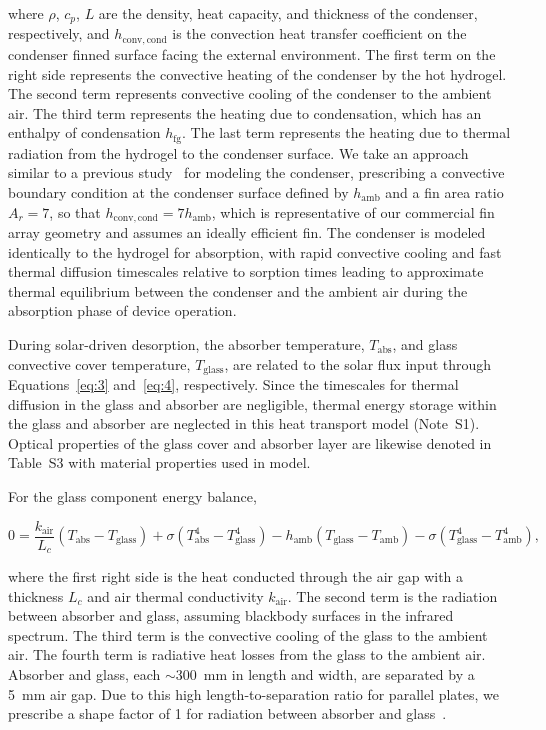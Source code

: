 \documentclass[11pt]{article}
\begin{document}
\noindent where $\rho$, $c_p$, $L$ are the density, heat capacity, and thickness of the condenser, respectively, and $h_{\mathrm{conv,cond}}$ is the convection heat transfer coefficient on the condenser finned surface facing the external environment. The first term on the right side represents the convective heating of the condenser by the hot hydrogel. The second term represents convective cooling of the condenser to the ambient air. The third term represents the heating due to condensation, which has an enthalpy of condensation $h_{\mathrm{fg}}$. The last term represents the heating due to thermal radiation from the hydrogel to the condenser surface. We take an approach similar to a previous study~\cite{lapotin2021} for modeling the condenser, prescribing a convective boundary condition at the condenser surface defined by $h_{\mathrm{amb}}$ and a fin area ratio $A_r = 7$, so that $h_{\mathrm{conv,cond}} = 7 h_{\mathrm{amb}}$, which is representative of our commercial fin array geometry and assumes an ideally efficient fin. The condenser is modeled identically to the hydrogel for absorption, with rapid convective cooling and fast thermal diffusion timescales relative to sorption times leading to approximate thermal equilibrium between the condenser and the ambient air during the absorption phase of device operation.

During solar-driven desorption, the absorber temperature, $T_{\mathrm{abs}}$, and glass convective cover temperature, $T_{\mathrm{glass}}$, are related to the solar flux input through Equations~\ref{eq:3} and~\ref{eq:4}, respectively. Since the timescales for thermal diffusion in the glass and absorber are negligible, thermal energy storage within the glass and absorber are neglected in this heat transport model (Note~S1). Optical properties of the glass cover and absorber layer are likewise denoted in Table~S3 with material properties used in model.

For the glass component energy balance,

\begin{equation}
0 = \frac{k_{\mathrm{air}}}{L_c}\left(T_{\mathrm{abs}} - T_{\mathrm{glass}}\right) + \sigma\left(T_{\mathrm{abs}}^4 - T_{\mathrm{glass}}^4\right) - h_{\mathrm{amb}}\left(T_{\mathrm{glass}} - T_{\mathrm{amb}}\right) - \sigma\left(T_{\mathrm{glass}}^4 - T_{\mathrm{amb}}^4\right),
\label{eq:3}
\end{equation}

\noindent where the first right side is the heat conducted through the air gap with a thickness $L_c$ and air thermal conductivity $k_{\mathrm{air}}$. The second term is the radiation between absorber and glass, assuming blackbody surfaces in the infrared spectrum. The third term is the convective cooling of the glass to the ambient air. The fourth term is radiative heat losses from the glass to the ambient air. Absorber and glass, each $\sim$300~mm in length and width, are separated by a 5~mm air gap. Due to this high length-to-separation ratio for parallel plates, we prescribe a shape factor of 1 for radiation between absorber and glass~\cite{kaviany2011}.
\end{document}
